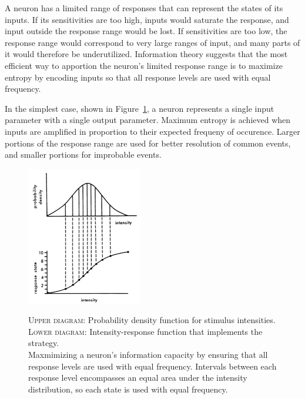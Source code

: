 \documentclass[twoside]{article}
\begin{document}
\begin{multicols}{2}
A neuron has a limited range of responses that can represent the states of its inputs. If its sensitivities are too high, inputs would saturate the response, and input outside the response range would be lost. If sensitivities are too low, the response range would correspond to very large ranges of input, and many parts of it would therefore be underutilized. Information theory suggests that the most efficient way to apportion the neuron's limited response range is to maximize entropy by encoding inputs so that all response levels are used with equal frequency. 

In the simplest case, shown in Figure~\ref{fig:laughlin1981-fig1}, a neuron represents a single input parameter with a single output parameter. Maximum entropy is achieved when inputs are amplified in proportion to their expected frequeny of occurence. Larger portions of the response range are used for better resolution of common events, and smaller portions for improbable events. 

\begin{figure}[H]
	\caption{
		\textsc{Upper diagram:} Probability density function for stimulus intensities. \\ \textsc{Lower diagram:} Intensity-response function that implements the strategy. \\ Maxmimizing a neuron's information capacity by ensuring that all response levels are used with equal frequency. Intervals between each response level encompasses an equal area under the intensity distribution, so each state is used with equal frequency.
	}
	\includegraphics[width=0.45\textwidth]{laughlin1981-fig1}
	\label{fig:laughlin1981-fig1}
\end{figure}


\end{multicols}
\end{document}
